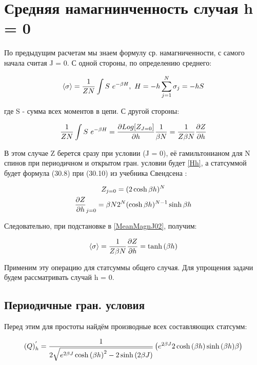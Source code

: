 \section{Средняя намагнинченность случая h = 0}

По предыдущим расчетам мы знаем формулу ср. намагниченности, с самого начала считая J = 0. С одной стороны, по определению среднего:

\begin{equation}\label{MeanMagnJ01}
    \langle\sigma\rangle = \frac{1}{ZN} \int S\ e^{-\beta H},\  H = -h\sum_{j=1}^{N}\sigma_{j} = -h S
\end{equation}

где S - сумма всех моментов в цепи. С другой стороны: 

\begin{equation}\label{MeanMagnJ02}
    \frac{1}{ZN} \int S\ e^{-\beta H} = \frac{\partial Log[Z_{J = 0}]}{\partial h} \frac{1}{\beta N} = \frac{1}{Z \beta N}  \frac{\partial Z}{\partial h}
\end{equation}

В этом случае Z берется сразу при условии (J = 0), её гамильтонианом для N спинов при периодичном и открытом гран. условии будет \eqref{Hh}, а статсуммой будет формула (30.8) при (30.10) из учебника Свендсена \cite{swendsen2020introduction}:

\begin{gather}
    \label{Zh0} Z_{j = 0} = (2\cosh{\beta h})^N \\
    \label{Z'hh0} \frac{\partial Z}{\partial h}_{j = 0} = \beta N 2^{N}(\cosh{\beta h})^{N-1}\sinh{\beta h}
\end{gather}

Следовательно, при подстановке в \eqref{MeanMagnJ02}, получим:

\begin{equation}\label{MeanMagnJ0Final}
    \langle\sigma\rangle = \frac{1}{Z \beta N}  \frac{\partial Z}{\partial h} = \tanh{(\beta h)}  
\end{equation}

Применим эту операцию для статсуммы общего случая.
Для упрощения задачи будем рассматривать случай h = 0.

\subsection{Периодичные гран. условия}

Перед этим для простоты найдём производные всех составляющих статсумм:

\begin{equation}\label{Q'h}
    (Q)^{'}_{h} = \frac{1}{2\sqrt{e^{2\beta J} \cosh{(\beta h)}^{2} - 2 \sinh{(2\beta J)}}}  \left( e^{2\beta J}2\cosh{(\beta h)} \sinh{(\beta h)}  \beta\right)
\end{equation}

